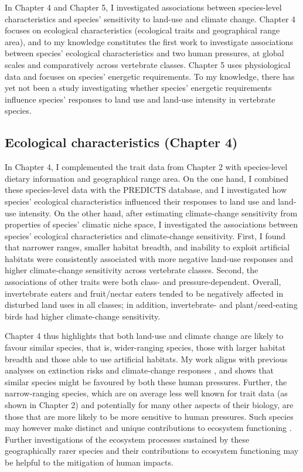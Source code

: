 In Chapter 4 and Chapter 5, I investigated associations between species-level characteristics and species' sensitivity to land-use and climate change. Chapter 4 focuses on ecological characteristics (ecological traits and geographical range area), and to my knowledge constitutes the first work to investigate associations between species' ecological characteristics and two human pressures, at global scales and comparatively across vertebrate classes. Chapter 5 uses physiological data and focuses on species' energetic requirements. To my knowledge, there has yet not been a study investigating whether species' energetic requirements influence species' responses to land use and land-use intensity in vertebrate species.

\subsection{Ecological characteristics (Chapter 4)}

In Chapter 4, I complemented the trait data from Chapter 2 with species-level dietary information and geographical range area. On the one hand, I combined these species-level data with the PREDICTS database, and I investigated how species' ecological characteristics influenced their responses to land use and land-use intensity. On the other hand, after estimating climate-change sensitivity from properties of species' climatic niche space, I investigated the associations between species' ecological characteristics and climate-change sensitivity. First, I found that narrower ranges, smaller habitat breadth, and inability to exploit artificial habitats were consistently associated with more negative land-use responses and higher climate-change sensitivity across vertebrate classes. Second, the associations of other traits were both class- and pressure-dependent. Overall, invertebrate eaters and fruit/nectar eaters tended to be negatively affected in disturbed land uses in all classes; in addition, invertebrate- and plant/seed-eating birds had higher climate-change sensitivity.

Chapter 4 thus highlights that both land-use and climate change are likely to favour similar species, that is, wider-ranging species, those with larger habitat breadth and those able to use artificial habitats. My work aligns with previous analyses on extinction risks \citep{Chichorro2019} and climate-change responses \citep{MacLean2017}, and shows that similar species might be favoured by both these human pressures. Further, the narrow-ranging species, which are on average less well known for trait data  (as shown in Chapter 2) and potentially for many other aspects of their biology, are those that are more likely to be more sensitive to human pressures. Such species may however make distinct and unique contributions to ecosystem functioning \citep{Mouillot2013,Dee2019}.  Further investigations of the ecosystem processes sustained by these geographically rarer species and their contributions to ecosystem functioning may be helpful to the mitigation of human impacts. 

